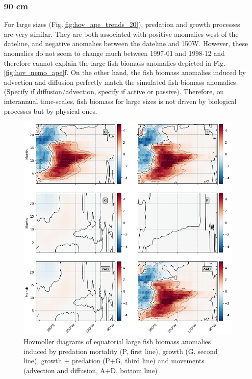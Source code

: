 \subsubsection{90 cm}

For large sizes (Fig.\ref{fig:hov_ape_trends_20}), predation and growth processes are very similar. They are both associated with positive anomalies west of the dateline, and negative anomalies between the dateline and 150W. However, these anomalies do not seem to change much between 1997-01 and 1998-12 and therefore cannot explain the large fish biomass anomalies depicted in Fig.\ref{fig:hov_nemo_ape}f. On the other hand, the fish biomass anomalies induced by advection and diffusion perfectly match the simulated fish biomass anomalies. \warn(Specify if diffusion/advection, specify if active or passive). Therefore, on interannual time-scales, fish biomass for large sizes is not driven by biological processes but by physical ones.

\begin{figure}[h!tp]
	\centering
	\includegraphics[scale=0.4]{figs/hov_compo_l_90.png}	
	\caption{Hovmoller diagrams of equatorial large fish biomass anomalies induced by predation mortality (P, first line), growth (G, second line), growth + predation (P+G, third line) and movements (advection and diffusion, A+D, bottom line)}	
	\label{fig:hov_ape_trends_90}
\end{figure}



